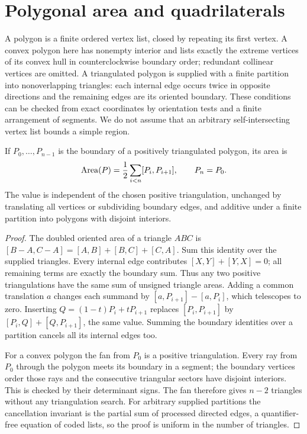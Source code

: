 \section{Polygonal area and quadrilaterals}
\label{sec:polygons}
A polygon is a finite ordered vertex list, closed by repeating its first
vertex. A convex polygon here has nonempty interior and lists exactly
the extreme vertices of its convex hull in counterclockwise boundary
order; redundant collinear vertices are omitted. A triangulated polygon is supplied
with a finite partition into nonoverlapping triangles: each internal edge
occurs twice in opposite directions and the remaining edges are its
oriented boundary. These conditions can be checked from exact coordinates
by orientation tests and a finite arrangement of segments. We do not
assume that an arbitrary self-intersecting vertex list bounds a simple region.

\begin{theorem}
\label{poly:shoelace}
If $P_0,\ldots,P_{n-1}$ is the boundary of a positively triangulated
polygon, its area is
\[
 \operatorname{Area}(P)=\frac12\sum_{i<n}[P_i,P_{i+1}],\qquad P_n=P_0.
\]
The value is independent of the chosen positive triangulation, unchanged
by translating all vertices or subdividing boundary edges, and additive
under a finite partition into polygons with disjoint interiors.
\end{theorem}
\begin{proof}
The doubled oriented area of a triangle $ABC$ is
$[B-A,C-A]=[A,B]+[B,C]+[C,A]$. Sum this identity over the supplied
triangles. Every internal edge contributes $[X,Y]+[Y,X]=0$; all
remaining terms are exactly the boundary sum. Thus any two positive
triangulations have the same sum of unsigned triangle areas. Adding a
common translation $a$ changes each summand by
$[a,P_{i+1}]-[a,P_i]$, which telescopes to zero. Inserting
$Q=(1-t)P_i+tP_{i+1}$ replaces $[P_i,P_{i+1}]$ by
$[P_i,Q]+[Q,P_{i+1}]$, the same value. Summing the boundary identities
over a partition cancels all its internal edges too.

For a convex polygon the fan from $P_0$ is a positive triangulation.
Every ray from $P_0$ through the polygon meets its boundary in a segment;
the boundary vertices order those rays and the consecutive triangular
sectors have disjoint interiors. This is checked by their determinant
signs. The fan therefore gives $n-2$ triangles without any triangulation
search. For arbitrary supplied partitions the cancellation invariant is
the partial sum of processed directed edges, a quantifier-free equation
of coded lists, so the proof is uniform in the number of triangles.
\end{proof}

